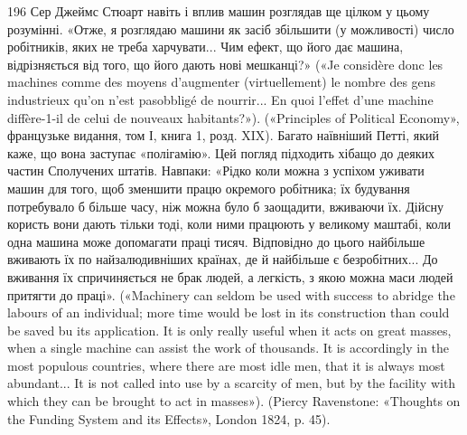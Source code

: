 196    Сер Джеймс Стюарт навіть і вплив машин розглядав ще цілком у
цьому розумінні. «Отже, я розглядаю машини як засіб збільшити (у можливості)
число робітників, яких не треба харчувати... Чим ефект, що його
дає машина, відрізняється від того, що його дають нові мешканці?»
(«Je considère donc les machines comme des moyens d’augmenter (virtuellement)
le nombre des gens industrieux qu’on n’est pasobbligé de nourrir...
En quoi l’effet d’une machine diffère-1-il de celui de nouveaux habitants?»).
(«Principles of Political Economy», французьке видання, том І, книга 1,
розд. XIX). Багато наївніший Петті, який каже, що вона заступає «полігамію».
Цей погляд підходить хібащо до деяких частин Сполучених штатів.
Навпаки: «Рідко коли можна з успіхом уживати машин для того, щоб
зменшити працю окремого робітника; їх будування потребувало б більше
часу, ніж можна було б заощадити, вживаючи їх. Дійсну користь вони
дають тільки тоді, коли ними працюють у великому маштабі, коли одна
машина може допомагати праці тисяч. Відповідно до цього найбільше
вживають їх по найзалюдивніших країнах, де й найбільше є безробітних...
До вживання їх спричиняється не брак людей, а легкість, з якою можна
маси людей притягти до праці». («Machinery can seldom be used with success
to abridge the labours of an individual; more time would be lost in its
construction than could be saved bu its application. It is only really useful
when it acts on great masses, when a single machine can assist the work
of thousands. It is accordingly in the most populous countries, where there
are most idle men, that it is always most abundant... It is not called into
use by a scarcity of men, but by the facility with which they can be
brought to act in masses»). (Piercy Ravenstone: «Thoughts on the Funding
System and its Effects», London 1824, p. 45).
